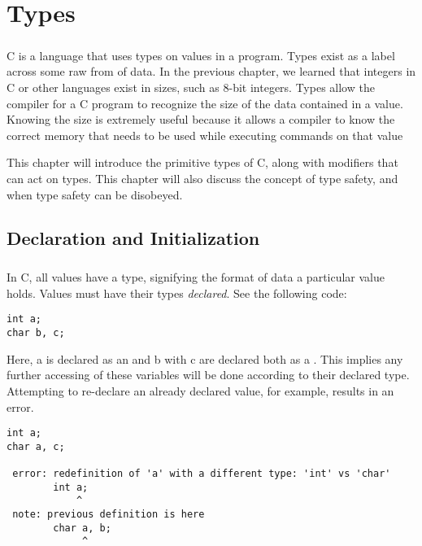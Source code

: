 \chapter{Types}

\paragraph{   } C is a language that uses types on values in a program. Types exist as a label across some raw from of data. In the previous chapter, we learned that integers in C or other languages exist in sizes, such as 8-bit integers. Types allow the compiler for a C program to recognize the size of the data contained in a value. Knowing the size is extremely useful because it allows a compiler to know  the correct memory that needs to be used while executing commands on that value
\par  This chapter will introduce the primitive types of C, along with modifiers that can act on types. This chapter will also discuss the concept of type safety, and when type safety can be disobeyed. 

\section{Declaration and Initialization}

\paragraph{   }  In C, all values have a type, signifying the format of data a particular value holds. Values must have their types \textit{declared}. See the following code:

\begin{lstlisting}[style=numc]
int a;
char b, c;
\end{lstlisting}

Here, a is declared as an  and b with c are declared both as a . This implies any further accessing of these variables will be done according to their declared type. Attempting to re-declare an already declared value, for example, results in an error.

\begin{lstlisting}[style=customc]
int a;
char a, c;

 error: redefinition of 'a' with a different type: 'int' vs 'char'
        int a;
            ^
 note: previous definition is here
        char a, b;
             ^
\end{lstlisting}

